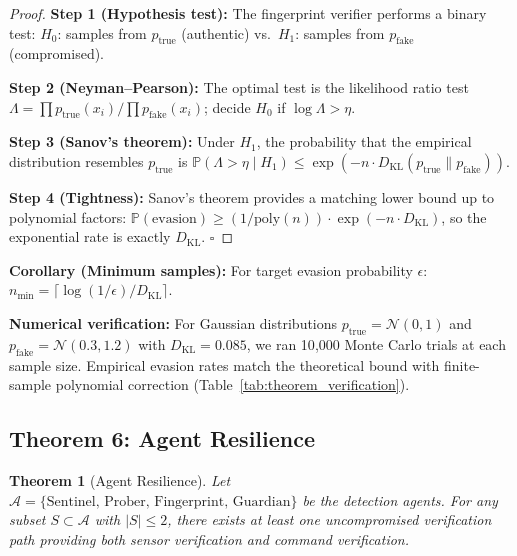 \documentclass[journal]{IEEEtran}
\newtheorem{theorem}{Theorem}
\newcommand{\Prob}{\mathbb{P}}
\newcommand{\KL}{D_{\mathrm{KL}}}
\begin{document}
\begin{proof}
\textbf{Step 1 (Hypothesis test):} The fingerprint verifier performs a binary test: $H_0$: samples from $p_{\text{true}}$ (authentic) vs.\ $H_1$: samples from $p_{\text{fake}}$ (compromised).

\textbf{Step 2 (Neyman--Pearson):} The optimal test is the likelihood ratio test $\Lambda = \prod p_{\text{true}}(x_i) / \prod p_{\text{fake}}(x_i)$; decide $H_0$ if $\log\Lambda > \eta$.

\textbf{Step 3 (Sanov's theorem):} Under $H_1$, the probability that the empirical distribution resembles $p_{\text{true}}$ is $\Prob(\Lambda > \eta \mid H_1) \le \exp(-n \cdot \KL(p_{\text{true}} \| p_{\text{fake}}))$.

\textbf{Step 4 (Tightness):} Sanov's theorem provides a matching lower bound up to polynomial factors: $\Prob(\text{evasion}) \ge (1/\text{poly}(n)) \cdot \exp(-n \cdot \KL)$, so the exponential rate is exactly $\KL$. $\square$
\end{proof}

\textbf{Corollary (Minimum samples):} For target evasion probability $\epsilon$: $n_{\min} = \lceil \log(1/\epsilon) / \KL \rceil$.

\textbf{Numerical verification:} For Gaussian distributions $p_{\text{true}} = \mathcal{N}(0, 1)$ and $p_{\text{fake}} = \mathcal{N}(0.3, 1.2)$ with $\KL = 0.085$, we ran 10{,}000 Monte Carlo trials at each sample size. Empirical evasion rates match the theoretical bound with finite-sample polynomial correction (Table~\ref{tab:theorem_verification}).

\subsection{Theorem 6: Agent Resilience}

\begin{theorem}[Agent Resilience]
\label{thm:resilience}
Let $\mathcal{A} = \{\text{Sentinel, Prober, Fingerprint, Guardian}\}$ be the detection agents. For any subset $S \subset \mathcal{A}$ with $|S| \le 2$, there exists at least one uncompromised verification path providing both sensor verification and command verification.
\end{theorem}
\end{document}
